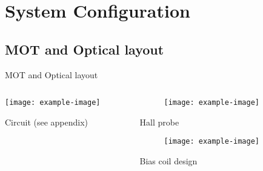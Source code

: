 \section{System Configuration}

\subsection{MOT and Optical layout}

\begin{frame}{MOT and Optical layout}
  \begin{columns}[onlytextwidth]
    \hspace{10pt}
    \begin{column}{0.6\textwidth}
      \texttt{[image: example-image]}
      \vspace{-30pt}
      \begin{center}
        Circuit (see appendix)
      \end{center}
    \end{column}
    \hspace{-30pt}
    \begin{column}{0.5\textwidth}
      \begin{minipage}{\textwidth}
        \vspace{-5pt}
        \begin{figure}[!h]
        \centering
        \texttt{[image: example-image]}
        \end{figure}
        \vspace{-25pt}
        \begin{center}
          Hall probe
        \end{center}
      \end{minipage}
      \begin{minipage}{\textwidth}
        \begin{figure}[!h]
        \centering
        \texttt{[image: example-image]}
        \end{figure}
        \vspace{-25pt}
        \begin{center}
          Bias coil design
        \end{center}
      \end{minipage}
    \end{column}
  \end{columns}
\end{frame}
